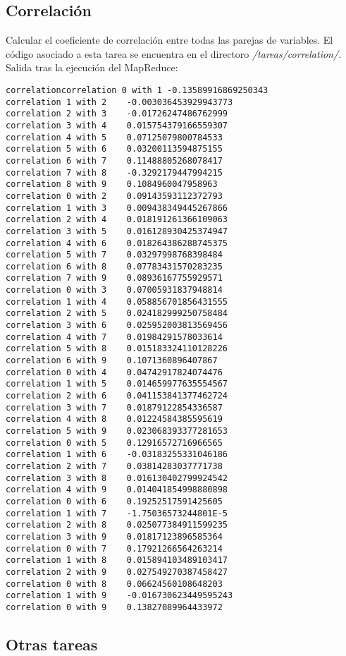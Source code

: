 \subsection{Correlación}

Calcular el coeficiente de correlación entre todas las parejas de variables. El código asociado a esta tarea se encuentra en el directoro \textit{/tareas/correlation/}. \\

Salida tras la ejecución del MapReduce:

\begin{lstlisting}
correlationcorrelation 0 with 1	-0.13589916869250343
correlation 1 with 2	-0.003036453929943773
correlation 2 with 3	-0.01726247486762999
correlation 3 with 4	0.015754379166559307
correlation 4 with 5	0.07125079800784533
correlation 5 with 6	0.03200113594875155
correlation 6 with 7	0.11488805268078417
correlation 7 with 8	-0.3292179447994215
correlation 8 with 9	0.1084960047958963
correlation 0 with 2	0.09143593112372793
correlation 1 with 3	0.009438349445267866
correlation 2 with 4	0.018191261366109063
correlation 3 with 5	0.016128930425374947
correlation 4 with 6	0.018264386288745375
correlation 5 with 7	0.03297998768398484
correlation 6 with 8	0.07783431570283235
correlation 7 with 9	0.08936167755929571
correlation 0 with 3	0.07005931837948814
correlation 1 with 4	0.058856701856431555
correlation 2 with 5	0.024182999250758484
correlation 3 with 6	0.025952003813569456
correlation 4 with 7	0.01984291578033614
correlation 5 with 8	0.015183324110128226
correlation 6 with 9	0.1071360896407867
correlation 0 with 4	0.04742917824074476
correlation 1 with 5	0.014659977635554567
correlation 2 with 6	0.041153841377462724
correlation 3 with 7	0.01879122854336587
correlation 4 with 8	0.01224584385595619
correlation 5 with 9	0.023068393377281653
correlation 0 with 5	0.12916572716966565
correlation 1 with 6	-0.03183255331046186
correlation 2 with 7	0.03814283037771738
correlation 3 with 8	0.016130402799924542
correlation 4 with 9	0.014041854998880898
correlation 0 with 6	0.19252517591425605
correlation 1 with 7	-1.75036573244801E-5
correlation 2 with 8	0.025077384911599235
correlation 3 with 9	0.01817123896585364
correlation 0 with 7	0.17921266564263214
correlation 1 with 8	0.015894103489103417
correlation 2 with 9	0.027549270387458427
correlation 0 with 8	0.06624560108648203
correlation 1 with 9	-0.016730623449595243
correlation 0 with 9	0.13827089964433972
\end{lstlisting}

\subsection{Otras tareas}

